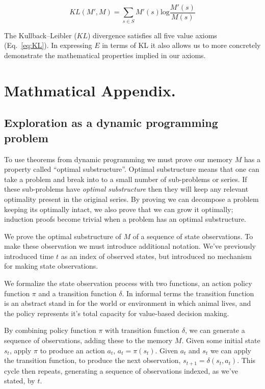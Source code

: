 \documentclass[9pt,twocolumn,twoside]{pnas-new}
\begin{document}
\begin{equation}
    KL(M', M) = \sum_{s \in S} M'(s) \text{log} \frac{M'(s)}{M(s)} 
    \label{eq:KL}
\end{equation}

The Kullback--Leibler ($KL$) divergence satisfies all five value axioms (Eq.~\ref{eq:KL}). In expressing $E$ in terms of KL it also allows us to more concretely demonstrate the mathematical properties implied in our axioms.




\clearpage
\newpage
\section*{Mathmatical Appendix.}
\subsection*{Exploration as a dynamic programming problem}
To use theorems from dynamic programming we must prove our memory $M$ has a property called ``optimal substructure''. Optimal substructure means that one can take a problem and break into to a small number of sub-problems or series. If these sub-problems have \textit{optimal substructure} then they will keep any relevant optimality present in the original series. By proving we can decompose a problem keeping its optimally intact, we also prove that we can grow it optimally; induction proofs become trivial when a problem has an optimal substructure.

We prove the optimal substructure of $M$ of a sequence of state observations. To make these observation we must introduce additional notation. We've previously introduced time $t$ as an index of observed states, but introduced no mechanism for making state observations. 

We formalize the state observation process with two functions, an action policy function $\pi$ and a transition function $\delta$. In informal terms the transition function is an abstract stand in for the world or environment in which animal lives, and the policy represents it's total capacity for value-based decision making.

By combining policy function $\pi$ with transition function $\delta$, we can generate a sequence of observations, adding these to the memory $M$. Given some initial state $s_{t}$, apply $\pi$ to produce an action $a_t$, $a_t = \pi(s_{t})$. Given $a_t$ and $s_{t}$ we can apply the transition function, to produce the next observation, $s_{t+1} = \delta (s_{t},a_t)$. This cycle then repeats, generating a sequence of observations indexed, as we've stated, by $t$.
\end{document}
